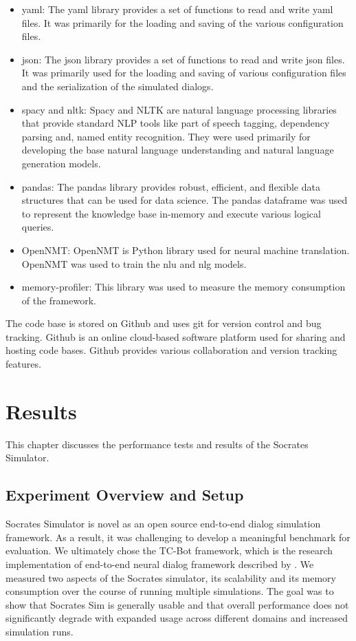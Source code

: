 \begin{itemize}
	\item yaml: The yaml library provides a set of functions to read and write yaml files. It was primarily for the loading and saving of the various configuration files. 
	\item json: The json library provides a set of functions to read and write json files. It was primarily used for the loading and saving of various configuration files and the serialization of the simulated dialogs. 
	\item spacy and nltk: Spacy and NLTK are natural language processing libraries that provide standard NLP tools like part of speech tagging, dependency parsing and, named entity recognition. They were used primarily for developing the base natural language understanding and natural language generation models. 
	\item pandas: The pandas library provides robust, efficient, and flexible data structures that can be used for data science. The pandas dataframe was used to represent the knowledge base in-memory and execute various logical queries.
	\item OpenNMT: OpenNMT is Python library used for neural machine translation. OpenNMT was used to train the nlu and nlg models.
	\item memory-profiler: This library was used to measure the memory consumption of the framework.  
\end{itemize}

The code base is stored on Github and uses git for version control and bug tracking. Github is an online cloud-based software platform used for sharing and hosting code bases. Github provides various collaboration and version tracking features.

\chapter{Results}

This chapter discusses the performance tests and results of the Socrates Simulator.

\section{Experiment Overview and Setup}

 Socrates Simulator is novel as an open source end-to-end dialog simulation framework. As a result, it was challenging to develop a meaningful benchmark for evaluation. We ultimately chose the TC-Bot framework, which is the research implementation of end-to-end neural dialog framework described by \cite{li_end_to_end}. We measured two aspects of the Socrates simulator, its scalability and its memory consumption over the course of running multiple simulations. The goal was to show that Socrates Sim is generally usable and that overall performance does not significantly degrade with expanded usage across different domains and increased simulation runs. 
 
